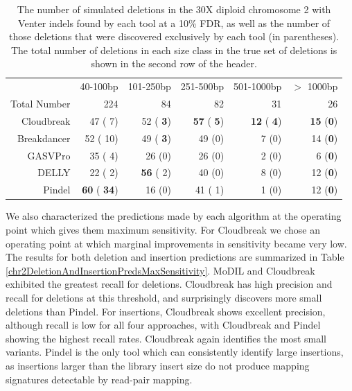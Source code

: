 \documentclass[11pt]{article}
\begin{document}
\begin{table}
\begin{center}
\begin{tabular}{rrrrrr}
  \hline
 & 40-100bp  & 101-250bp  & 251-500bp & 501-1000bp & $>$ 1000bp \\ 
 Total Number & 224 &  84 & 82 &  31 & 26\\ 
  \hline
  Cloudbreak  &  47 (  7)  &  52 (\textbf{  3}) &  \textbf{ 57} (\textbf{  5}) & \textbf{ 12} (\textbf{  4}) & \textbf{ 15} (\textbf{0}) \\ 
  Breakdancer &  52 ( 10)  &  49 (\textbf{  3}) &   49 (0) &   7 (0) &  14 (\textbf{0}) \\ 
  GASVPro     &  35 (  4)  &  26 (0) &   26 (0) &   2 (0) &   6 (\textbf{0}) \\ 
  DELLY       &  22 (  2)  & \textbf{ 56} (  2) &   40 (0) &   8 (0) &  12 (\textbf{0}) \\ 
  Pindel      & \textbf{ 60} (\textbf{ 34})  &  16 (0) &   41 (  1) &   1 (0) &  12 (\textbf{0})\\ 
   \hline
\end{tabular}
\end{center}
\caption{The number of simulated deletions in the 30X diploid chromosome 2 with Venter indels found by each tool at a 10\% FDR, as well as the number of those deletions that were discovered exclusively by each tool (in parentheses). The total number of deletions in each size class in the true set of deletions is shown in the second row of the header.}
\label{chr2DeletionPredsFDR10}
\end{table}

We also characterized the predictions made by each algorithm at the operating point which gives them maximum sensitivity. For Cloudbreak we chose an operating point at which marginal improvements in sensitivity became very low. The results for both deletion and insertion predictions are summarized in Table \ref{chr2DeletionAndInsertionPredsMaxSensitivity}. MoDIL and Cloudbreak exhibited the greatest recall for deletions. Cloudbreak has high precision and recall for deletions at this threshold, and surprisingly discovers more small deletions than Pindel. For insertions, Cloudbreak shows excellent precision, although recall is low for all four approaches, with Cloudbreak and Pindel showing the highest recall rates. Cloudbreak again identifies the most small variants. Pindel is the only tool which can consistently identify large insertions, as insertions larger than the library insert size do not produce mapping signatures detectable by read-pair mapping.
\end{document}
